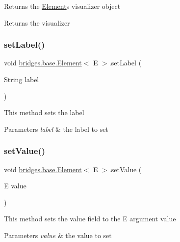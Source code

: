 Returns the \hyperlink{classbridges_1_1base_1_1_element}{Element}\textquotesingle{}s visualizer object \begin{DoxyReturn}{Returns}
the visualizer 
\end{DoxyReturn}
\hypertarget{classbridges_1_1base_1_1_element_a942ccd766aeca0c4fdbe27ef8cbe78d9}{}\label{classbridges_1_1base_1_1_element_a942ccd766aeca0c4fdbe27ef8cbe78d9} 
\subsubsection{\texorpdfstring{set\+Label()}{setLabel()}}
{\footnotesize\ttfamily void \hyperlink{classbridges_1_1base_1_1_element}{bridges.\+base.\+Element}$<$ E $>$.set\+Label (\begin{DoxyParamCaption}\item[{String}]{label }\end{DoxyParamCaption})}

This method sets the label 
\begin{DoxyParams}{Parameters}
{\em label} & the label to set \\
\hline
\end{DoxyParams}
\hypertarget{classbridges_1_1base_1_1_element_ab3cf1241da0bc4c59cea9d6f0fd7aaf4}{}\label{classbridges_1_1base_1_1_element_ab3cf1241da0bc4c59cea9d6f0fd7aaf4} 
\subsubsection{\texorpdfstring{set\+Value()}{setValue()}}
{\footnotesize\ttfamily void \hyperlink{classbridges_1_1base_1_1_element}{bridges.\+base.\+Element}$<$ E $>$.set\+Value (\begin{DoxyParamCaption}\item[{E}]{value }\end{DoxyParamCaption})}

This method sets the value field to the E argument value 
\begin{DoxyParams}{Parameters}
{\em value} & the value to set \\
\hline
\end{DoxyParams}
\hypertarget{classbridges_1_1base_1_1_element_a5befa95788099f1bc72cdf5361c55bed}{}\label{classbridges_1_1base_1_1_element_a5befa95788099f1bc72cdf5361c55bed} 
